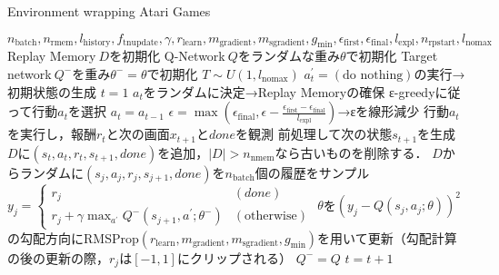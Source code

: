 \documentclass{jarticle}
\begin{document}
\begin{algorithm}[tb]
\caption{Environment wrapping Atari Games}
\label{alg:env}                          
\begin{algorithmic}[1]   
\REQUIRE $n_{\mathrm{batch}},n_{\mathrm{rmem}},l_{\mathrm{history}},f_{\mathrm{tnupdate}},\gamma,r_{\mathrm{learn}},m_{\mathrm{gradient}},m_{\mathrm{sgradient}},g_{\mathrm{min}},\epsilon_{\mathrm{first}},\epsilon_{\mathrm{final}},l_{\mathrm{expl}},n_{\mathrm{rpstart}},l_{\mathrm{nomax}}$
\STATE Replay Memory$~D$を初期化
\STATE Q-Network$~Q$をランダムな重み$\theta$で初期化
\STATE Target network$~Q^-$を重み$\theta^-=\theta$で初期化
\STATE $T\sim U(1,l_{\mathrm{nomax}})$
\STATE $a_t^{\prime}=(\mbox{do nothing})$の実行→初期状態の生成
\ENDFOR
\STATE $t=1$
\STATE $a_t$をランダムに決定→Replay Memoryの確保
\ELSE
{}
\STATE ε-greedyに従って行動$a_t$を選択
\ELSE
\STATE $a_t=a_{t-1}$
\ENDIF
\STATE $\epsilon=\max{(\epsilon_{\mathrm{final}},\epsilon-\frac{\epsilon_{\mathrm{first}}-\epsilon_{\mathrm{final}}}{l_{\mathrm{expl}}})}$→εを線形減少
\ENDIF
\STATE 行動$a_t$を実行し，報酬$r_t$と次の画面$x_{t+1}$と$done$を観測
\STATE 前処理して次の状態$s_{t+1}$を生成
\STATE $D$に$(s_t,a_t,r_t,s_{t+1},done)$を追加，$|D|>n_{\mathrm{nmem}}$なら古いものを削除する．
\STATE $D$からランダムに$(s_j,a_j,r_j,s_{j+1},done)$を$n_{\mathrm{batch}}$個の履歴をサンプル
\STATE $y_j=
\begin{cases}
r_j & (done) \\
r_j+\gamma\max_{a^{\prime}}Q^-(s_{j+1},a^{\prime};\theta^-) & (\mbox{otherwise})
\end{cases}$
\STATE $\theta$を$(y_j-Q(s_j,a_j;\theta))^2$の勾配方向にRMSProp$(r_{\mathrm{learn}},m_{\mathrm{gradient}},m_{\mathrm{sgradient}},g_{\mathrm{min}})$を用いて更新（勾配計算の後の更新の際，$r_j$は$[-1,1]$にクリップされる）
\ENDIF
{}
\STATE $Q^-=Q$
\ENDIF
\ENDIF
\STATE $t=t+1$
\ENDWHILE
\ENDFOR
\end{algorithmic}
\end{algorithm}
\end{document}
